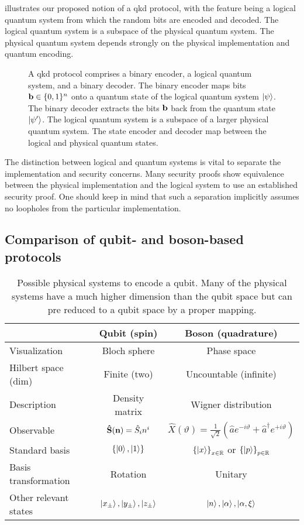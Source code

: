  illustrates our proposed notion of a \gls{qkd} protocol, with the feature being a logical quantum system from which the random bits are encoded and decoded.
The logical quantum system is a subspace of the physical quantum system.
The physical quantum system depends strongly on the physical implementation and quantum encoding.
\begin{figure}[htb]
	\centering
	
	\caption{A \gls{qkd} protocol comprises a binary encoder, a logical quantum system, and a binary decoder. The binary encoder maps bits $\vb{b}\in\{0,1\}^n$ onto a quantum state of the logical quantum system $\ket{\psi}$. The binary decoder extracts the bits $\vb{b}$ back from the quantum state $\ket{\psi^\prime}$. The logical quantum system is a subspace of a larger physical quantum system. The state encoder and decoder map between the logical and physical quantum states.}\label{fig:qkd_protocol}
\end{figure}
The distinction between logical and quantum systems is vital to separate the implementation and security concerns.
Many security proofs show equivalence between the physical implementation and the logical system to use an established security proof.
One should keep in mind that such a separation implicitly assumes no loopholes from the particular implementation.

\subsection{Comparison of qubit- and boson-based protocols}


\begin{table}[htb]
	\centering	
	\begin{tabular}{lcc}
		\toprule
			& Qubit (spin) & Boson (quadrature) \\
		\midrule
			Visualization & Bloch sphere & Phase space \\
			Hilbert space (dim) & Finite (two) & Uncountable (infinite) \\
			Description & Density matrix & Wigner distribution \\
			Observable & $\vb{\hat{S}}(\vb{n})=\hat{S}_in^i$ & $\hat{X}(\vartheta)=\frac{1}{\sqrt{2}}\left(\hat{a}e^{-i\vartheta}+\hat{a}^\dagger e^{+i\vartheta}\right)$ \\
			Standard basis & $\left\{\ket{0},\ket{1}\right\}$ & $\left\{\ket{x}\right\}_{x\in\mathbb{R}}$ or $\left\{\ket{p}\right\}_{p\in\mathbb{R}}$ \\
			Basis transformation & Rotation & Unitary \\
			Other relevant states & $\ket{x_\pm},\ket{y_\pm},\ket{z_\pm}$ & $\ket{n},\ket{\alpha},\ket{\alpha,\xi}$ \\
		\bottomrule
	\end{tabular}
	\caption{Possible physical systems to encode a qubit. Many of the physical systems have a much higher dimension than the qubit space but can pre reduced to a qubit space by a proper mapping.}
\end{table}